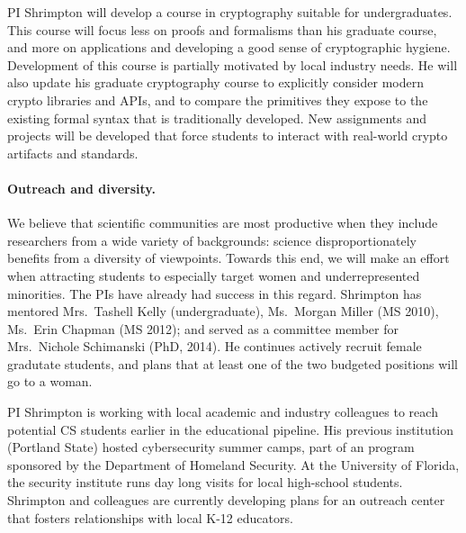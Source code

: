 PI Shrimpton will develop a course in cryptography suitable for undergraduates.  This course will focus less on proofs and
formalisms than his graduate course, and more on applications and developing a good sense of
cryptographic hygiene.  Development of this course is partially
motivated by local industry needs.  
%
He will also update his graduate
cryptography course to explicitly consider modern crypto libraries and
APIs, and to compare the primitives they expose to the existing formal
syntax that is traditionally developed.  New assignments and projects
will be developed that force students to interact with real-world
crypto artifacts and standards.

\paragraph{Outreach and diversity.} We believe that scientific
communities are most productive when they include researchers from a wide
variety of backgrounds: science disproportionately benefits from a diversity of
viewpoints.  Towards this end,  we will make an effort when attracting students
to especially target women and underrepresented minorities.  The PIs have
already had success in this regard.  Shrimpton has mentored Mrs.\ Tashell
Kelly (undergraduate), 
Ms.\ Morgan Miller (MS 2010), Ms.\ Erin Chapman (MS 2012); 
and served as a committee member for Mrs.\ Nichole Schimanski (PhD,
2014).  He continues actively recruit female gradutate students, and
plans that at least one of the two budgeted positions will go to a woman.

PI Shrimpton is working with local academic and industry colleagues 
to reach potential CS students earlier in the educational pipeline.
His previous institution (Portland
State) hosted cybersecurity summer camps, part of an program
sponsored by the Department of Homeland Security.  At the University
of Florida, the security institute runs day long visits for local
high-school students.  Shrimpton and colleagues
are currently developing plans for an outreach center that fosters 
relationships with local K-12 educators. 

